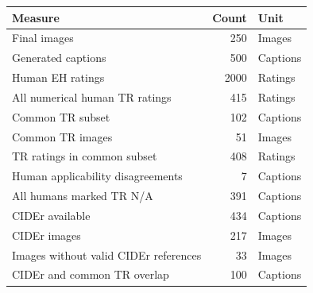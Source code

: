 \begin{tabular}{lrl}
\toprule
Measure & Count & Unit \\
\midrule
Final images & 250 & Images \\
Generated captions & 500 & Captions \\
Human EH ratings & 2000 & Ratings \\
All numerical human TR ratings & 415 & Ratings \\
Common TR subset & 102 & Captions \\
Common TR images & 51 & Images \\
TR ratings in common subset & 408 & Ratings \\
Human applicability disagreements & 7 & Captions \\
All humans marked TR N/A & 391 & Captions \\
CIDEr available & 434 & Captions \\
CIDEr images & 217 & Images \\
Images without valid CIDEr references & 33 & Images \\
CIDEr and common TR overlap & 100 & Captions \\
\bottomrule
\end{tabular}
